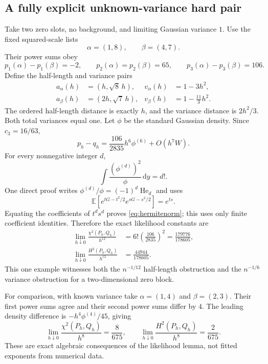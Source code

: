 \documentclass[11pt,a4paper]{article}
\numberwithin{equation}{section}
\theoremstyle{definition}
\theoremstyle{remark}
\newcommand{\E}{\mathbb E}
\newcommand{\dd}{\,\mathrm d}
\begin{document}
\subsection{A fully explicit unknown-variance hard pair}
Take two zero slots, no background, and limiting Gaussian variance $1$.
Use the fixed squared-scale lists
\begin{equation}
 \alpha=(1,8),\qquad \beta=(4,7).
\end{equation}
Their power sums obey
\begin{equation}
 p_1(\alpha)-p_1(\beta)=-2,\qquad
 p_2(\alpha)=p_2(\beta)=65,\qquad
 p_3(\alpha)-p_3(\beta)=106.
 \label{eq:explicitpowers}
\end{equation}
Define the half-length and variance pairs
\begin{align}
 a_\alpha(h)&=(h,\sqrt8\,h),&v_\alpha(h)&=1-3h^2,\\
 a_\beta(h)&=(2h,\sqrt7\,h),&v_\beta(h)&=1-\frac{11}{3}h^2.
 \label{eq:explicitpair}
\end{align}
The ordered half-length distance is exactly $h$, and the variance distance
is $2h^2/3$. Both total variances equal one. Let $\phi$ be the standard
Gaussian density. Since $c_3=16/63$,
\begin{equation}
 p_h-q_h=\frac{106}{2835}h^6\phi^{(6)}+O(h^7W).
 \label{eq:explicitdensity}
\end{equation}
For every nonnegative integer $d$,
\begin{equation}
 \int\frac{(\phi^{(d)})^2}{\phi}\dd y=d!.
 \label{eq:hermitenorm}
\end{equation}
One direct proof writes $\phi^{(d)}/\phi=(-1)^d\operatorname{He}_d$ and uses
\[
 \E\left[e^{tG-t^2/2}e^{sG-s^2/2}\right]=e^{ts}.
\]
Equating the coefficients of $t^d s^d$ proves
\eqref{eq:hermitenorm}; this uses only finite coefficient identities.
Therefore the exact likelihood constants are
\begin{align}
 \lim_{h\downarrow0}\frac{\chi^2(P_h,Q_h)}{h^{12}}
   &=6!\left(\frac{106}{2835}\right)^2
     =\frac{179776}{178605},\\
 \lim_{h\downarrow0}\frac{H^2(P_h,Q_h)}{h^{12}}
   &=\frac{44944}{178605}.
 \label{eq:explicitconstants}
\end{align}
This one example witnesses both the $n^{-1/12}$ half-length obstruction and
the $n^{-1/6}$ variance obstruction for a two-dimensional zero block.

For comparison, with known variance take $\alpha=(1,4)$ and $\beta=(2,3)$.
Their first power sums agree and their second power sums differ by $4$.
The leading density difference is $-h^4\phi^{(4)}/45$, giving
\begin{equation}
 \lim_{h\downarrow0}\frac{\chi^2(P_h,Q_h)}{h^8}=\frac{8}{675},\qquad
 \lim_{h\downarrow0}\frac{H^2(P_h,Q_h)}{h^8}=\frac{2}{675}.
\end{equation}
These are exact algebraic consequences of the likelihood lemma, not fitted
exponents from numerical data.
\end{document}
